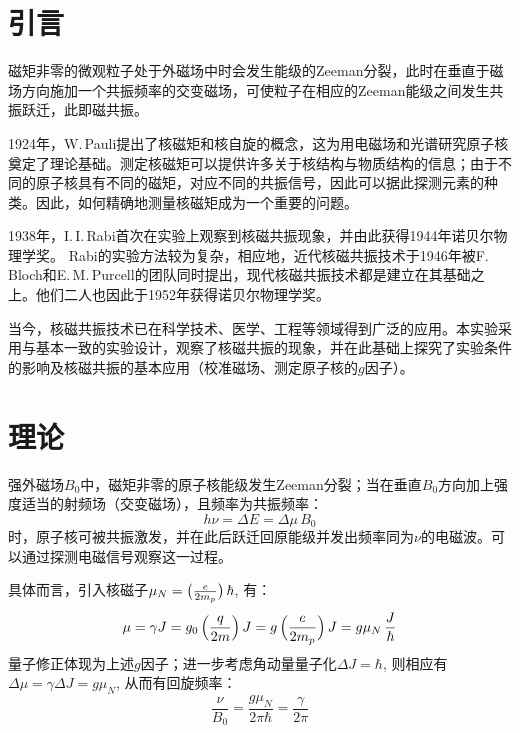 \documentclass[aps,pre,12pt,preprint,%
	onecolumn,showpacs,showkeys,nofootinbib]{revtex4-1}
\begin{document}
\section{引言}
	磁矩非零的微观粒子处于外磁场中时会发生能级的Zeeman分裂，此时在垂直于磁场方向施加一个共振频率的交变磁场，可使粒子在相应的Zeeman能级之间发生共振跃迁，此即磁共振。

	1924年，W.\,Pauli提出了核磁矩和核自旋的概念，这为用电磁场和光谱研究原子核奠定了理论基础。测定核磁矩可以提供许多关于核结构与物质结构的信息；由于不同的原子核具有不同的磁矩，对应不同的共振信号，因此可以据此探测元素的种类。因此，如何精确地测量核磁矩成为一个重要的问题。
	
	1938年，I.\,I.\,Rabi首次在实验上观察到核磁共振现象\supercite{rabi1938new}，并由此获得1944年诺贝尔物理学奖。
	Rabi的实验方法较为复杂，相应地，近代核磁共振技术于1946年被F.\,Bloch和E.\,M.\,Purcell的团队同时提出\supercite{PhysRev.69.37,PhysRev.70.474}，现代核磁共振技术都是建立在其基础之上。他们二人也因此于1952年获得诺贝尔物理学奖。
	
	当今，核磁共振技术已在科学技术、医学、工程等领域得到广泛的应用。本实验采用与\cite{PhysRev.70.474}基本一致的实验设计，观察了核磁共振的现象，并在此基础上探究了实验条件的影响及核磁共振的基本应用（校准磁场、测定原子核的$g$因子）。
\section{理论}
	强外磁场$B_0$中，磁矩非零的原子核能级发生Zeeman分裂；当在垂直$B_0$方向加上强度适当的射频场（交变磁场），且频率为共振频率：
	\begin{equation}
		h\nu = \Delta E = \Delta\mu\,B_0
	\end{equation}
	时，原子核可被共振激发，并在此后跃迁回原能级并发出频率同为$\nu$的电磁波。可以通过探测电磁信号观察这一过程。
\clearpage

\setlength{\jot}{0pt}
	具体而言，引入核磁子$\mu_N = \pqty\big{\frac{e}{2m_p}}\,\hbar$, 有：
	\begin{equation}
		\mu = \gamma J
		= g_0\,\pqty\Big{\frac{q}{2m}}\,J
		= g\,\pqty\Big{\frac{e}{2m_p}}\,J
		= g\mu_N\,\frac{J}{\hbar}
	\end{equation}
	量子修正体现为上述$g$因子；进一步考虑角动量量子化$\Delta J = \hbar$, 则相应有$\Delta\mu = \gamma \Delta J = g\mu_N$, 从而有回旋频率：
	\begin{equation}
		\frac{\nu}{B_0}
		= \frac{g\mu_N}{2\pi\hbar}
		= \frac{\gamma}{2\pi}
	\label{eq:resonance_simplified}
	\end{equation}
	
\end{document}
